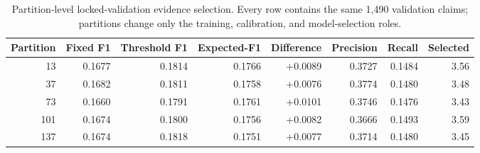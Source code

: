 \begin{table}[t]
\centering
\caption{Partition-level locked-validation evidence selection. Every row contains the same 1,490 validation claims; partitions change only the training, calibration, and model-selection roles.}
\label{tab:partition-selector-results}
\small
\setlength{\tabcolsep}{5pt}
\begin{tabular}{rrrrrrrr}
\toprule
Partition & Fixed F1 & Threshold F1 & Expected-F1 & Difference & Precision & Recall & Selected \\
\midrule
13 & 0.1677 & 0.1814 & 0.1766 & +0.0089 & 0.3727 & 0.1484 & 3.56 \\
37 & 0.1682 & 0.1811 & 0.1758 & +0.0076 & 0.3774 & 0.1480 & 3.48 \\
73 & 0.1660 & 0.1791 & 0.1761 & +0.0101 & 0.3746 & 0.1476 & 3.43 \\
101 & 0.1674 & 0.1800 & 0.1756 & +0.0082 & 0.3666 & 0.1493 & 3.59 \\
137 & 0.1674 & 0.1818 & 0.1751 & +0.0077 & 0.3714 & 0.1480 & 3.45 \\
\bottomrule
\end{tabular}
\end{table}
